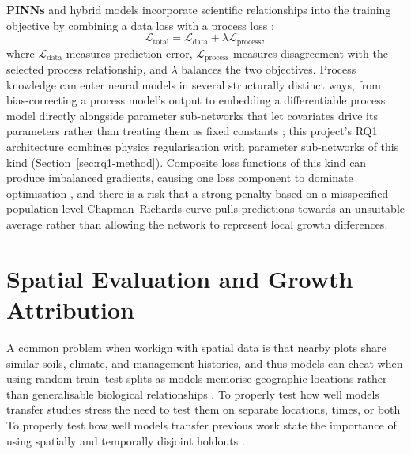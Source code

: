 \documentclass[logo,msc,ai]{infthesis}           %
\begin{document}
\textbf{PINNs} and hybrid models incorporate scientific relationships into the training objective by combining a data loss with a process loss \cite{karpatne2017Theory_C4_NN,raissi2019Physics_C4_NN, karniadakis2021Physics_C4_NN,willard2022Integrating_C4_NN}:
\begin{equation}
\mathcal{L}_{\text{total}} = \mathcal{L}_{\text{data}} + \lambda\mathcal{L}_{\text{process}},
\label{eq:pinn-loss-general}
\end{equation}
where $\mathcal{L}_{\text{data}}$ measures prediction error, $\mathcal{L}_{\text{process}}$ measures disagreement with the selected process relationship, and $\lambda$ balances the two objectives. Process knowledge can enter neural models in several structurally distinct ways, from bias-correcting a process model's output to embedding a differentiable process model directly alongside parameter sub-networks that let covariates drive its parameters rather than treating them as fixed constants \cite{wesselkamp2024Process_C4_NN}; this project's RQ1 architecture combines physics regularisation with parameter sub-networks of this kind (Section~\ref{sec:rq1-method}). Composite loss functions of this kind can produce imbalanced gradients, causing one loss component to dominate optimisation \cite{wang2021Understanding_C4_NN,rathore2024Challenges_C4_NN}, and there is a risk that a strong penalty based on a misspecified population-level Chapman--Richards curve pulls predictions towards an unsuitable average rather than allowing the network to represent local growth differences.


\section{Spatial Evaluation and Growth Attribution}
\label{sec:background-spatial-eval}

A common problem when workign with spatial data is that nearby plots share similar soils, climate, and management histories, and thus models can cheat when using random train--test splits as models memorise geographic locations rather than generalisable biological relationships \cite{ploton2020Spatial_C5_EVAL, karasiak2022Spatial_C5_EVAL}. To properly test how well models transfer studies stress the need to test them on separate locations, times, or both To properly test how well models transfer previous work state the importance of using spatially and temporally disjoint holdouts \cite{meyer2018Improving_C5_EVAL}.
\end{document}
